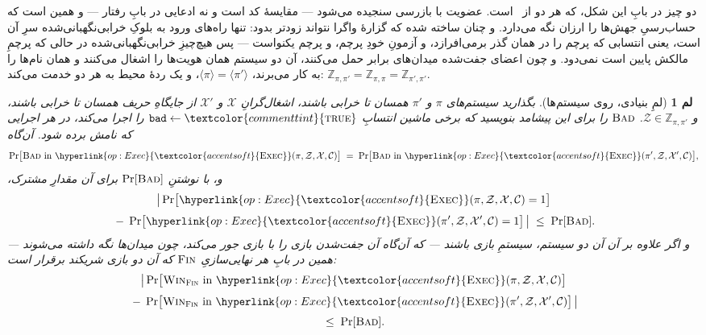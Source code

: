 \documentclass[10pt,oneside,openany]{book}
\newcommand{\Corr}{\mathcal{C}}
\newcommand{\Zenv}{\mathcal{Z}}
\newcommand{\ZenvSet}{\mathbb{Z}}
\newcommand{\op}[1]{\textnormal{\textsc{#1}}}
\newcommand{\opl}[1]{\hyperlink{op:#1}{\textcolor{accentsoft}{\op{#1}}}}
\newcommand{\atom}[1]{\textcolor{commenttint}{\op{#1}}}
\newcommand{\true}{\atom{true}}
\newcommand{\Win}{\op{Win}}
\newcommand{\Bad}{\op{Bad}}
\newcommand{\V}[1]{\mathtt{#1}}
\newcommand{\ncl}[1]{\langle #1 \rangle}
\theoremstyle{accentdef}
\theoremstyle{accentplain}
\newtheorem{lemma}[definition]{لم}
\begin{document}
دو چیز در بابِ این شکل، که هر دو از~\cite{BR06} است. عضویت با بازرسی سنجیده
می‌شود --- مقایسهٔ کد است و نه ادعایی در بابِ رفتار --- و همین است که
حساب‌رسیِ جهش‌ها را ارزان نگه می‌دارد. و چنان ساخته شده که گزارهٔ واگرا
نتواند زودتر بدود: تنها راه‌های ورود به بلوکِ خرابی‌نگهبانی‌شده سرِ آن است،
یعنی انتسابی که پرچم را در همان گذر برمی‌افرازد، و آزمونِ خودِ پرچم، و پرچم
یکنواست --- پس هیچ‌چیزِ خرابی‌نگهبانی‌شده در حالی که پرچمِ مالکش پایین است
نمی‌دود. و چون اعضای جفت‌شده میدان‌های برابر حمل می‌کنند، آن دو سیستم همان
هویت‌ها را اشغال می‌کنند و همان نام‌ها را به کار می‌برند، $\ncl{\pi} =
\ncl{\pi'}$، و یک ردهٔ محیط به هر دو خدمت می‌کند: $\ZenvSet_{\pi,\pi'} =
\ZenvSet_{\pi,\pi} = \ZenvSet_{\pi',\pi'}$.

\begin{lemma}[لمِ بنیادی، روی سیستم‌ها]\label{lem:iub}
بگذارید سیستم‌های $\pi$ و $\pi'$ همسان تا خرابی باشند، اشغال‌گرانِ
$\mathcal{X}$ و $\mathcal{X}'$ از جایگاهِ حریف همسان تا خرابی باشند، و
$\Zenv \in \ZenvSet_{\pi,\pi'}$. $\Bad$ را برای این پیشامد بنویسید که برخی
ماشین انتسابِ $\V{bad} \gets \true$ را اجرا می‌کند، در هر اجرایی که نامش
برده شود. آن‌گاه
\[
  \Pr\bigl[\Bad \text{ in } \opl{Exec}(\pi,\Zenv,\mathcal{X},\Corr)\bigr]
  \;=\;
  \Pr\bigl[\Bad \text{ in } \opl{Exec}(\pi',\Zenv,\mathcal{X}',\Corr)\bigr] ,
\]
و، با نوشتنِ $\Pr[\Bad]$ برای آن مقدارِ مشترک،
\[
  \begin{gathered}
  \bigl|\, \Pr\bigl[\opl{Exec}(\pi,\Zenv,\mathcal{X},\Corr) = 1\bigr] \\[3pt]
  \;-\; \Pr\bigl[\opl{Exec}(\pi',\Zenv,\mathcal{X}',\Corr) = 1\bigr] \,\bigr|
  \;\leq\; \Pr[\Bad] .
  \end{gathered}
\]
و اگر علاوه بر آن آن دو سیستم، سیستمِ بازی باشند --- که آن‌گاه آن جفت‌شدن
بازی را با بازی جور می‌کند، چون میدان‌ها نگه داشته می‌شوند --- همین در بابِ
هر نهایی‌سازیِ $\op{Fin}$ که آن دو بازی شریکند برقرار است:
\[
  \begin{gathered}
  \bigl|\, \Pr\bigl[\Win_{\op{Fin}} \text{ in } \opl{Exec}(\pi,\Zenv,\mathcal{X},\Corr)\bigr] \\[3pt]
  \;-\; \Pr\bigl[\Win_{\op{Fin}} \text{ in } \opl{Exec}(\pi',\Zenv,\mathcal{X}',\Corr)\bigr]
  \,\bigr| \\[3pt]
  \;\leq\; \Pr[\Bad] .
  \end{gathered}
\]
\end{lemma}
\end{document}
